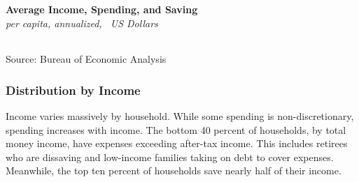 \documentclass{report}
\begin{document}
{\begin{minipage}{0.76\textwidth}
\normalsize \textbf{Average Income, Spending, and Saving}\\
\footnotesize{\textit{per capita, annualized, \unskip \ US Dollars}}\\
\noindent \hspace*{-3mm}  \setlength{\tabcolsep}{3.1pt} \color{black!90}
		{\renewcommand{\arraystretch}{1.6}
		 \begin{tabular}{p{37mm} R{11.4mm} R{11.4mm} R{11.4mm} R{11.4mm} R{11.4mm} R{11.4mm}}
			  \hline
		\end{tabular}}\vspace{-2mm}
		
\footnotesize{Source: Bureau of Economic Analysis}
\end{minipage}
\newpage
\subsubsection*{\color{black!70}\seriffont Distribution by Income}
\begin{minipage}{0.76\textwidth}
\small Income varies massively by household. While some spending is non-discretionary, spending increases with income. The bottom 40 percent of households, by total money income, have expenses exceeding after-tax income. This includes retirees who are dissaving and low-income families taking on debt to cover expenses. Meanwhile, the top ten percent of households save nearly half of their income.


\end{minipage}
\vspace{1mm}

}
\end{document}
